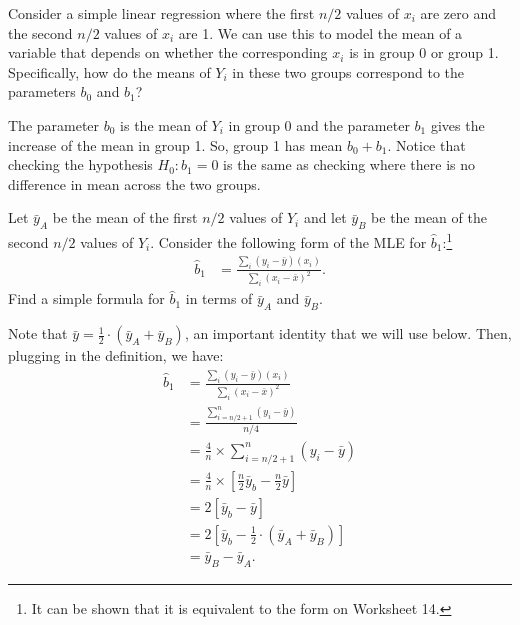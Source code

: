 
Consider a simple linear regression where the first $n/2$ values of $x_i$ are 
zero and the second $n/2$ values of $x_i$ are 1. We can use this to model the
mean of a variable that depends on whether the corresponding $x_i$ is in group
0 or group 1. Specifically, how do the means of $Y_i$ in these two groups
correspond to the parameters $b_0$ and $b_1$?


The parameter $b_0$ is the mean of $Y_i$ in group 0 and the parameter $b_1$ gives
the increase of the mean in group 1. So, group 1 has mean $b_0 + b_1$. Notice that
checking the hypothesis $H_0: b_1 = 0$ is the same as checking where there is no
difference in mean across the two groups.


Let $\bar{y}_A$ be the mean of the first $n/2$ values of $Y_i$ and let $\bar{y}_B$
be the mean of the second $n/2$ values of $Y_i$. Consider the following form of the
MLE for $\widehat{b}_1$:\footnote{
  It can be shown that it is equivalent to the form on Worksheet 14.
}
\begin{align*}
\widehat{b}_1 &= \frac{\sum_i (y_i - \bar{y}) (x_i)}{\sum_i (x_i - \bar{x})^2}.
\end{align*}
Find a simple formula for $\widehat{b}_1$ in terms of $\bar{y}_A$ and $\bar{y}_B$.


Note that $\bar{y} = \frac{1}{2} \cdot (\bar{y}_A + \bar{y}_B)$, an important
identity that we will use below. Then, plugging in the definition, we have:
\begin{align*}
\widehat{b}_1 &= \frac{\sum_i (y_i - \bar{y}) (x_i)}{\sum_i (x_i - \bar{x})^2} \\
&= \frac{\sum_{i=n/2+1}^{n} (y_i - \bar{y})}{n/4} \\
&= \frac{4}{n} \times \sum_{i=n/2+1}^{n} (y_i - \bar{y}) \\
&= \frac{4}{n} \times \left[ \frac{n}{2} \bar{y}_b - \frac{n}{2} \bar{y} \right] \\
&= 2 \left[ \bar{y}_b - \bar{y} \right] \\
&= 2 \left[ \bar{y}_b - \frac{1}{2} \cdot (\bar{y}_A + \bar{y}_B) \right] \\
&= \bar{y}_B - \bar{y}_A.
\end{align*}

